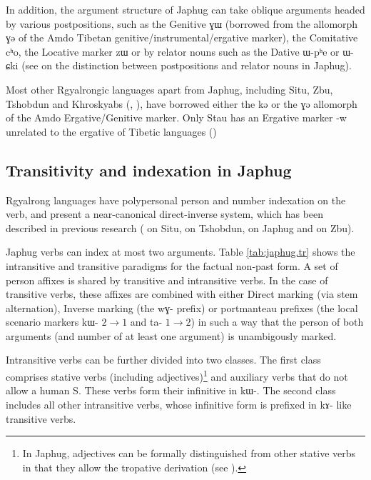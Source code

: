 \documentclass[oldfontcommands,oneside,a4paper,11pt]{article}
\newcommand{\ipa}[1]{{\phon \mbox{#1}}} %
\begin{document}
In addition, the argument structure of Japhug can take oblique arguments headed by various postpositions, such as the Genitive \ipa{ɣɯ} (borrowed from the allomorph \ipa{ɣə} of the Amdo Tibetan genitive/instrumental/ergative marker), the Comitative \ipa{cʰo}, the Locative marker \ipa{zɯ} or by relator nouns such as the Dative  \ipa{ɯ-pʰe} or \ipa{ɯ-ɕki} (see \citealt[272-274]{jacques14linking} on the distinction between postpositions and relator nouns in Japhug).

Most other Rgyalrongic languages apart from Japhug, including Situ, Zbu, Tshobdun and Khroskyabs (\citealt{jackson98morphology}, \citealt{lai13affixale}), have borrowed either the \ipa{kə} or the \ipa{ɣə} allomorph of the Amdo  Ergative/Genitive marker. Only Stau has an Ergative marker \ipa{-w} unrelated to the ergative of Tibetic languages (\citealt{jacques14rtau})

\subsection{Transitivity and indexation in Japhug}
Rgyalrong languages have polypersonal person and number indexation on the verb, and present a near-canonical direct-inverse system, which has been described in previous research (\citealt{delancey81direction} on Situ,  \citealt{jackson02rentongdengdi} on Tshobdun,  \citealt{jacques10inverse} on Japhug and \citealt{gongxun14agreement} on Zbu). 

Japhug verbs can index at most two arguments. Table \ref{tab:japhug.tr} shows the intransitive and transitive paradigms for the factual non-past form. A set of person affixes is shared by transitive and intransitive verbs. In the case of transitive verbs, these affixes are combined with either Direct marking (via stem alternation), Inverse marking (the \ipa{wɣ-} prefix) or portmanteau prefixes (the local scenario markers \ipa{kɯ-} $2\rightarrow1$ and \ipa{ta-} $1\rightarrow2$) in such a way that the person of both arguments (and number of at least one argument) is unambigously marked.

Intransitive verbs can be further divided into two classes. The first class comprises stative verbs (including adjectives)\footnote{In Japhug, adjectives can be formally distinguished from other stative verbs in that they allow the tropative derivation (see \citealt{jacques13tropative}).} and auxiliary verbs that do not allow a human S. These verbs form their infinitive in \ipa{kɯ-}. The second class includes all other intransitive verbs, whose infinitive form is prefixed in \ipa{kɤ-} like transitive verbs.
\end{document}
